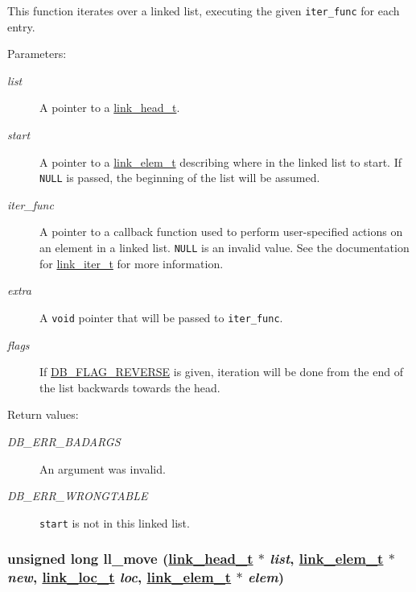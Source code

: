This function iterates over a linked list, executing the given {\tt iter\_\-func} for each entry.\begin{Desc}
\item[Parameters: ]\par
\begin{description}
\item[{\em 
list}]A pointer to a \hyperlink{group__dbprim__link_a0}{link\_\-head\_\-t}. \item[{\em 
start}]A pointer to a \hyperlink{group__dbprim__link_a1}{link\_\-elem\_\-t} describing where in the linked list to start. If {\tt NULL} is passed, the beginning of the list will be assumed. \item[{\em 
iter\_\-func}]A pointer to a callback function used to perform user-specified actions on an element in a linked list. {\tt NULL} is an invalid value. See the documentation for \hyperlink{group__dbprim__link_a2}{link\_\-iter\_\-t} for more information. \item[{\em 
extra}]A {\tt void} pointer that will be passed to {\tt iter\_\-func}. \item[{\em 
flags}]If \hyperlink{group__dbprim_a4}{DB\_\-FLAG\_\-REVERSE} is given, iteration will be done from the end of the list backwards towards the head.\end{description}
\end{Desc}
\begin{Desc}
\item[Return values: ]\par
\begin{description}
\item[{\em 
DB\_\-ERR\_\-BADARGS}]An argument was invalid. \item[{\em 
DB\_\-ERR\_\-WRONGTABLE}]{\tt start} is not in this linked list. \end{description}
\end{Desc}
\hypertarget{group__dbprim__link_a7}{
\subsubsection[ll\_\-move]{\setlength{\rightskip}{0pt plus 5cm}unsigned long ll\_\-move (\hyperlink{group__dbprim__link_a0}{link\_\-head\_\-t} $\ast$ {\em list}, \hyperlink{group__dbprim__link_a1}{link\_\-elem\_\-t} $\ast$ {\em new}, \hyperlink{group__dbprim__link_a4}{link\_\-loc\_\-t} {\em loc}, \hyperlink{group__dbprim__link_a1}{link\_\-elem\_\-t} $\ast$ {\em elem})}}
\label{group__dbprim__link_a7}


